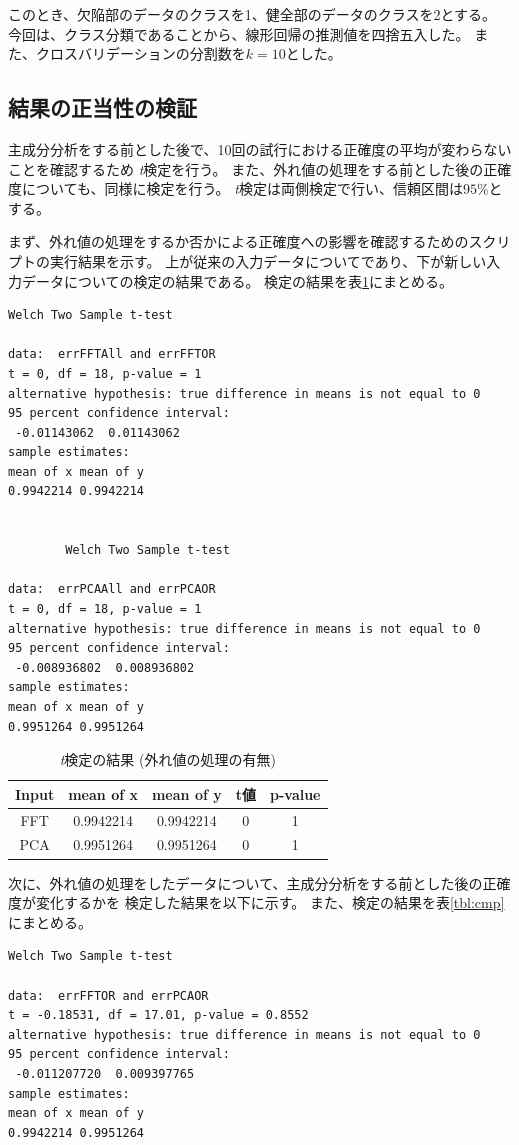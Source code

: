 \documentclass{jsarticle}
\begin{document}
このとき、欠陥部のデータのクラスを1、健全部のデータのクラスを2とする。
今回は、クラス分類であることから、線形回帰の推測値を四捨五入した。
また、クロスバリデーションの分割数を$k=10$とした。

\subsection*{結果の正当性の検証}
主成分分析をする前とした後で、10回の試行における正確度の平均が変わらないことを確認するため
\emph{t}検定を行う。
また、外れ値の処理をする前とした後の正確度についても、同様に検定を行う。
\emph{t}検定は両側検定で行い、信頼区間は$95\%$とする。

まず、外れ値の処理をするか否かによる正確度への影響を確認するためのスクリプトの実行結果を示す。
上が従来の入力データについてであり、下が新しい入力データについての検定の結果である。
検定の結果を表\ref{tbl:outlier}にまとめる。

\begin{lstlisting}[basicstyle=\ttfamily\footnotesize, frame=single]
        Welch Two Sample t-test

data:  errFFTAll and errFFTOR
t = 0, df = 18, p-value = 1
alternative hypothesis: true difference in means is not equal to 0
95 percent confidence interval:
 -0.01143062  0.01143062
sample estimates:
mean of x mean of y
0.9942214 0.9942214


        Welch Two Sample t-test

data:  errPCAAll and errPCAOR
t = 0, df = 18, p-value = 1
alternative hypothesis: true difference in means is not equal to 0
95 percent confidence interval:
 -0.008936802  0.008936802
sample estimates:
mean of x mean of y
0.9951264 0.9951264
\end{lstlisting}

\begin{table}
	\centering
	\caption{\emph{t}検定の結果 (外れ値の処理の有無)}
	\label{tbl:outlier}
	\begin{tabular}{c||c|c|c|c}
		\hline
		Input & mean of x & mean of y & t値 & p-value \\ \hline \hline
		FFT & 0.9942214 & 0.9942214 & 0 & 1 \\ \hline
		PCA & 0.9951264 & 0.9951264 & 0 & 1 \\ \hline
	\end{tabular}
\end{table}

次に、外れ値の処理をしたデータについて、主成分分析をする前とした後の正確度が変化するかを
検定した結果を以下に示す。
また、検定の結果を表\ref{tbl:cmp}にまとめる。
\begin{lstlisting}[basicstyle=\ttfamily\footnotesize, frame=single]
        Welch Two Sample t-test

data:  errFFTOR and errPCAOR
t = -0.18531, df = 17.01, p-value = 0.8552
alternative hypothesis: true difference in means is not equal to 0
95 percent confidence interval:
 -0.011207720  0.009397765
sample estimates:
mean of x mean of y
0.9942214 0.9951264
\end{lstlisting}
\end{document}
